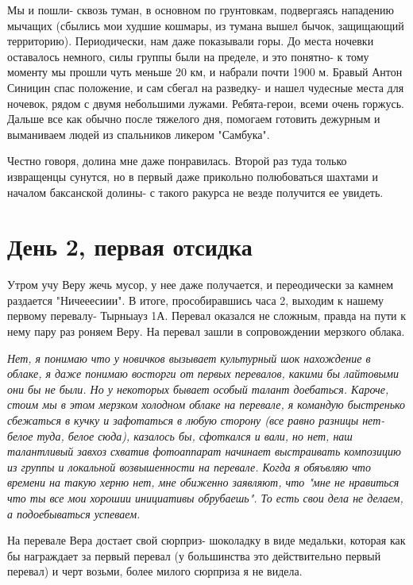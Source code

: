 \documentclass[]{article}
\begin{document}
Мы и пошли- сквозь туман, в основном по грунтовкам, подвергаясь нападению мычащих (сбылись мои худшие кошмары, из тумана вышел бычок, защищающий территорию). Периодически, нам даже показывали горы. До места ночевки оставалось немного, силы группы были на пределе, и это понятно- к тому моменту мы прошли чуть меньше 20 км, и набрали почти 1900 м.
Бравый Антон Синицин спас положение, и сам сбегал на разведку- и нашел чудесные места для ночевок, рядом с двумя небольшими лужами. Ребята-герои, всеми очень горжусь.
Дальше все как обычно после тяжелого дня, помогаем готовить дежурным и выманиваем людей из спальников ликером "Самбука".

Честно говоря, долина мне даже понравилась. Второй раз туда только извращенцы сунутся, но в первый даже прикольно полюбоваться шахтами и началом баксанской долины- с такого ракурса не везде получится ее увидеть.
   
\section{День 2, первая отсидка}

Утром учу Веру жечь мусор, у нее даже получается, и переодически за камнем раздается "Ничееесиии". В итоге, прособиравшись часа 2, выходим к нашему первому перевалу- Тырныауз 1А. Перевал оказался не сложным, правда на пути к нему пару раз роняем Веру. На перевал зашли в сопровождении мерзкого облака.

 \textit{Нет, я понимаю что у новичков вызывает культурный шок нахождение в облаке, я даже понимаю восторги от первых перевалов, какими бы лайтовыми они бы не были. Но у некоторых бывает особый талант доебаться. Кароче, стоим мы в этом мерзком холодном облаке на перевале, я командую быстренько сбежаться в кучку и зафотаться в любую сторону (все равно разницы нет- белое туда, белое сюда), казалось бы, сфоткался и вали, но нет, наш талантливый завхоз схватив фотоаппарат начинает выстраивать композицию из группы и локальной возвышенности на перевале. Когда я обяъвляю что времени на такую херню нет, мне обиженно заявляют, что "мне не нравиться что ты все мои хорошии инициативы обрубаешь". То есть свои дела не делаем, а подоебываться успеваем. } 
 
  На перевале Вера достает свой сюрприз- шоколадку в виде медальки, которая как бы награждает за первый перевал (у большинства это действительно первый перевал) и черт возьми, более милого сюрприза я не видела. 
\end{document}
